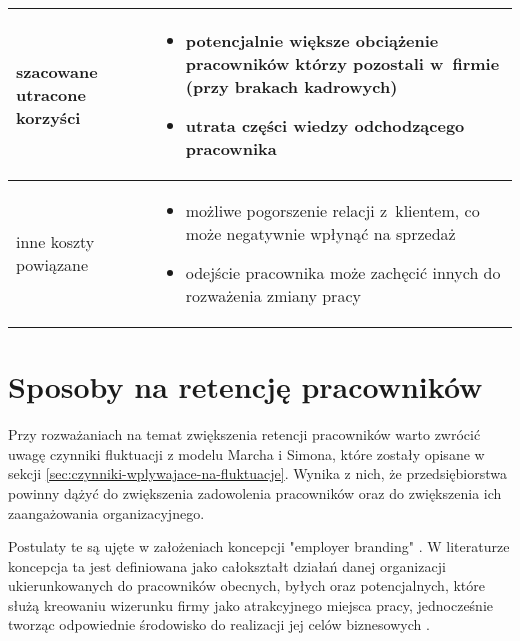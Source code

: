 \begin{minipage}{\textwidth}
\begin{table}[H]
\begin{center}
\begin{tabular}{|P{.15\textwidth}|P{.75\textwidth}|}
                         szacowane utracone korzyści &
                         \begin{itemize}
                             \item potencjalnie większe obciążenie pracowników którzy pozostali w~firmie (przy brakach kadrowych)
                             \item utrata części wiedzy odchodzącego pracownika
                         \end{itemize} \\
                         \hline

                         inne koszty powiązane &
                         \begin{itemize}
                             \item możliwe pogorszenie relacji z~klientem, co może negatywnie wpłynąć na sprzedaż
                             \item odejście pracownika może zachęcić innych do rozważenia zmiany pracy
                         \end{itemize} \\
                         \hline
                     \end{tabular}
                 \end{center}
                 \raggedright{}
                 \vspace{0.75cm}
             \end{table}
\end{minipage}


\section{Sposoby na retencję pracowników}\label{sec:retencja}

Przy rozważaniach na temat zwiększenia retencji pracowników warto zwrócić uwagę czynniki fluktuacji z modelu Marcha i Simona,
które zostały opisane w sekcji \ref{sec:czynniki-wplywajace-na-fluktuacje}.
Wynika z nich, że przedsiębiorstwa powinny dążyć do zwiększenia zadowolenia pracowników oraz do zwiększenia ich zaangażowania organizacyjnego.

Postulaty te są ujęte w założeniach koncepcji "employer branding" \cite{spychala-2019}.
W literaturze koncepcja ta jest definiowana jako
całokształt działań danej organizacji ukierunkowanych do pracowników obecnych, byłych oraz potencjalnych,
które służą kreowaniu wizerunku firmy jako atrakcyjnego miejsca pracy,
jednocześnie tworząc odpowiednie środowisko do realizacji jej celów biznesowych \cite{kozlowski-2012}.

